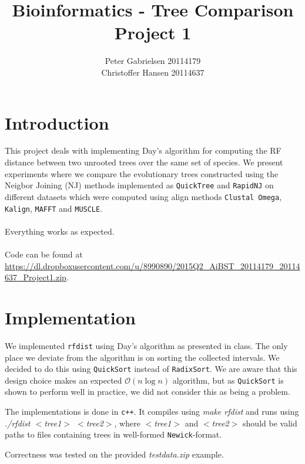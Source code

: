 \documentclass[a4paper,oneside,article,11pt]{memoir}
\title{Bioinformatics - Tree Comparison \\ Project 1}
\author{Peter Gabrielsen 20114179\\
Christoffer Hansen 20114637}
\begin{document}
\maketitle

\chapter*{Introduction}
This project deals with implementing Day's algorithm for computing the RF distance between two unrooted trees over the same set of species. We present experiments where we compare the evolutionary trees constructed using the Neigbor Joining (NJ) methods implemented as \texttt{QuickTree} and \texttt{RapidNJ} on different datasets which were computed using align methods \texttt{Clustal Omega}, \texttt{Kalign}, \texttt{MAFFT} and \texttt{MUSCLE}.\\ \\Everything works as expected.
\\\\Code can be found at \url{https://dl.dropboxusercontent.com/u/8990890/2015Q2_AiBST_20114179_20114637_Project1.zip}.

\pagebreak

\chapter*{Implementation}

We implemented \texttt{rfdist} using Day's algorithm as presented in class. The only place we deviate from the algorithm is on sorting the collected intervals. We decided to do this using \texttt{QuickSort} instead of \texttt{RadixSort}. We are aware that this design choice makes an expected $\mathcal{O}(n \log n)$ algorithm, but as \texttt{QuickSort} is shown to perform well in practice, we did not consider this as being a problem.

The implementations is done in \texttt{c++}. It compiles using \textit{make rfdist} and runs using \textit{./rfdist $<$tree1$>$ $<$tree2$>$}, where \textit{$<$tree1$>$} and \textit{$<$tree2$>$} should be valid paths to files containing trees in well-formed \texttt{Newick}-format.

Correctness was tested on the provided \textit{testdata.zip} example.
\end{document}

